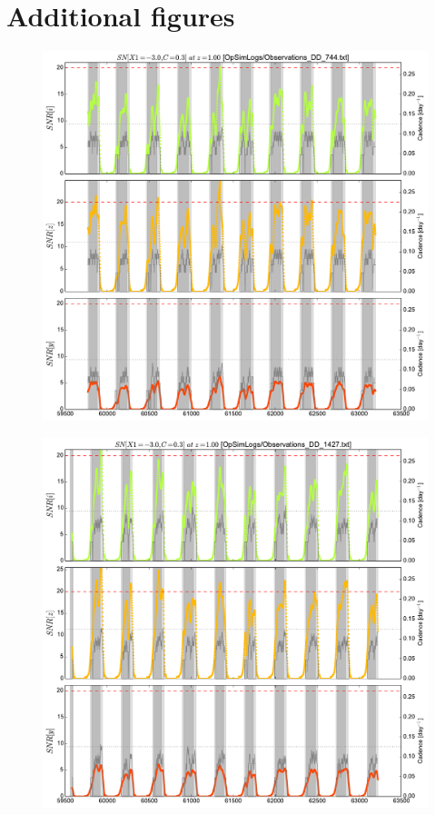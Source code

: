 \documentclass[\docopts]{\docclass}
\begin{document}
\section{Additional figures}

\begin{figure}[t]
  \begin{center}
    \includegraphics[width=\linewidth]{metric_DD_744.pdf}
    \caption{}
  \end{center}
\end{figure}


\begin{figure}[t]
  \begin{center}
    \includegraphics[width=\linewidth]{metric_DD_1427.pdf}
    \caption{}
  \end{center}
\end{figure}
\end{document}
